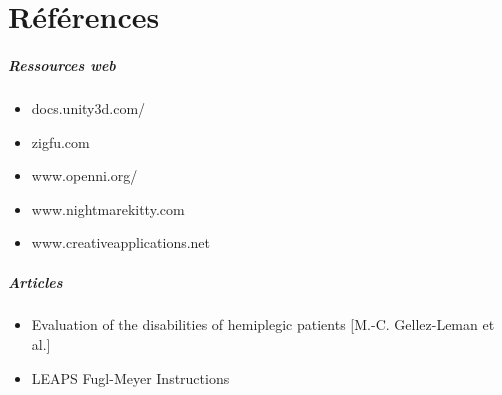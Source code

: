 \chapter{Références}
\paragraph{Ressources web}
  \begin{itemize}
	\item docs.unity3d.com/
    \item zigfu.com
    \item www.openni.org/
    \item www.nightmarekitty.com 
    \item www.creativeapplications.net
  \end{itemize}
  
\paragraph{Articles}
  \begin {itemize}
    \item Evaluation of the disabilities of hemiplegic patients [M.-C. Gellez-Leman et al.] \label{ref_analyse_litterature}
    \item LEAPS Fugl-Meyer Instructions
  \end{itemize}
        
        
        
